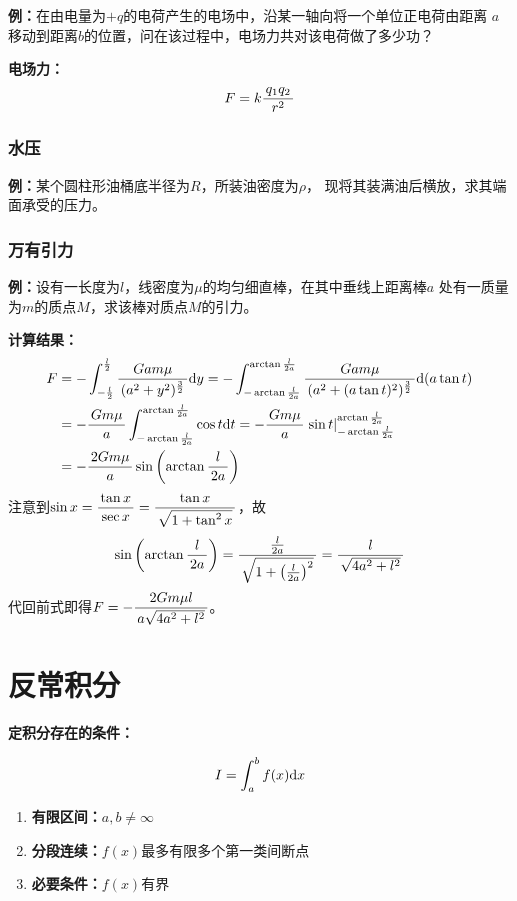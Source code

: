 {\bf 例：}在由电量为$+q$的电荷产生的电场中，沿某一轴向将一个单位正电荷由距离
$a$移动到距离$b$的位置，问在该过程中，电场力共对该电荷做了多少功？

{\bf 电场力：}
$$F=k\displaystyle\frac{\,{q_1q_2}\,}{\,{r^2}\,}$$

\subsubsection{水压}

{\bf 例：}某个圆柱形油桶底半径为$R$，所装油密度为$\rho$，
现将其装满油后横放，求其端面承受的压力。

\subsubsection{万有引力}

{\bf 例：}设有一长度为$l$，线密度为$\mu$的均匀细直棒，在其中垂线上距离棒$a$
处有一质量为$m$的质点$M$，求该棒对质点$M$的引力。

{\bf 计算结果：}
\begin{align}
	F&=-\displaystyle\int_{-\frac l2}^{\frac l2}\displaystyle\frac{\,{Gam\mu}\,}{\,{(a^2+y^2)^{\frac32}}\,}\mathrm{d} y
	=-\displaystyle\int_{-\arctan\frac l{2a}}^{\arctan\frac l{2a}}\displaystyle\frac{\,{Gam\mu}\,}{\,{(a^2+(a\tan
	t)^2)^{\frac32}}\,}\mathrm{d} (a\tan t)\notag\\
	&=-\displaystyle\frac{\,{Gm\mu}\,}{\,{a}\,}\displaystyle\int_{-\arctan\frac l{2a}}^{\arctan\frac
	l{2a}}\cos t\mathrm{d} t=-\displaystyle\frac{\,{Gm\mu}\,}{\,{a}\,}\left.\sin t\right|_{-\arctan\frac
	l{2a}}^{\arctan\frac l{2a}}\notag\\
	&=-\displaystyle\frac{\,{2Gm\mu}\,}{\,{a}\,}\sin\left(\arctan\displaystyle\frac{\,{l}\,}{\,{2a}\,}\right)\notag
\end{align}
注意到$\sin x=\displaystyle\frac{\,{\tan x}\,}{\,{\sec x}\,}=\displaystyle\frac{\,{\tan x}\,}{\,{\sqrt{1+\tan^2 x}}\,}$，故
$$\sin\left(\arctan\displaystyle\frac{\,{l}\,}{\,{2a}\,}\right)=\displaystyle\frac{\,{\frac{l}{2a}}\,}{\,{\sqrt{1+\left(\frac{l}{2a}\right)^2}}\,}=\displaystyle\frac{\,{l}\,}{\,{\sqrt{4a^2+l^2}}\,}$$
代回前式即得$F=-\displaystyle\frac{\,{2Gm\mu l}\,}{\,{a\sqrt{4a^2+l^2}}\,}$。

\section{反常积分}

{\bf 定积分存在的条件：}

$${I=\displaystyle\int_a^bf(x)\mathrm{d} x}$$

\begin{enumerate} [(1)]
  \setlength{\itemindent}{1cm}
  \item {\bf 有限区间：}$a,b\ne \infty$
  \item {\bf 分段连续：}$f(x)$最多有限多个第一类间断点 
  \item {\bf 必要条件：}$f(x)$有界
\end{enumerate}

